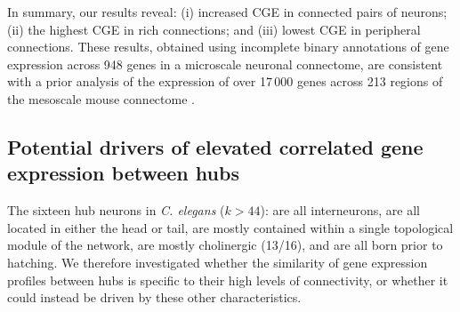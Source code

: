 In summary, our results reveal:
(i) increased CGE in connected pairs of neurons;
(ii) the highest CGE in rich connections; and
(iii) lowest CGE in peripheral connections.
These results, obtained using incomplete binary annotations of gene expression across 948 genes in a microscale neuronal connectome, are consistent with a prior analysis of the expression of over 17\,000 genes across 213 regions of the mesoscale mouse connectome \citep{Fulcher2016}.

\subsection{Potential drivers of elevated correlated gene expression between hubs}
The sixteen hub neurons in \emph{C. elegans} ($k > 44$):
are all interneurons,
are all located in either the head or tail,
are mostly contained within a single topological module of the network,
are mostly cholinergic (13/16),
and are all born prior to hatching.
We therefore investigated whether the similarity of gene expression profiles between hubs is specific to their high levels of connectivity, or whether it could instead be driven by these other characteristics.


